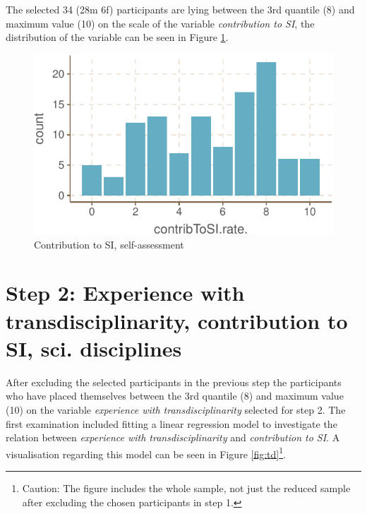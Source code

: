 \documentclass[]{tufte-book}
\begin{document}
The selected 34 (28m \textbar{} 6f) participants are lying between the
3rd quantile (8) and maximum value (10) on the scale of the variable
\emph{contribution to SI}, the distribution of the variable can be seen
in Figure \ref{fig:step1}.

\begin{figure}
    
\includegraphics{SIVOCS_int-cand_files/figure-latex/step1-1}
\caption{Contribution to SI, self-assessment}
\label{fig:step1}
\end{figure}

\hypertarget{step-2-experience-with-transdisciplinarity-contribution-to-si-sci.-disciplines}{%
\section{Step 2: Experience with transdisciplinarity, contribution to
SI, sci.
disciplines}\label{step-2-experience-with-transdisciplinarity-contribution-to-si-sci.-disciplines}}

After excluding the selected participants in the previous step the
participants who have placed themselves between the 3rd quantile (8) and
maximum value (10) on the variable \emph{experience with
transdisciplinarity} selected for step 2. The first examination included
fitting a linear regression model to investigate the relation between
\emph{experience with transdisciplinarity} and \emph{contribution to
SI}. A visualisation regarding this model can be seen in Figure
\ref{fig:td}\footnote{Caution: The figure includes the whole
  sample, not just the reduced sample after excluding the chosen
  participants in step 1.}.
\end{document}
